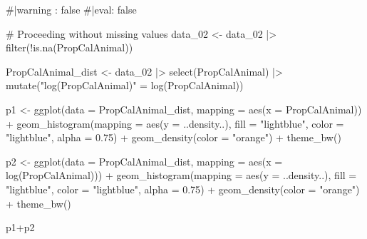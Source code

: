 \documentclass[
  letterpaper,
  DIV=11,
  numbers=noendperiod]{scrartcl}
\newenvironment{Shaded}{\begin{snugshade}}{\end{snugshade}}
\newcommand{\AttributeTok}[1]{\textcolor[rgb]{0.40,0.45,0.13}{#1}}
\newcommand{\CommentTok}[1]{\textcolor[rgb]{0.37,0.37,0.37}{#1}}
\newcommand{\FloatTok}[1]{\textcolor[rgb]{0.68,0.00,0.00}{#1}}
\newcommand{\FunctionTok}[1]{\textcolor[rgb]{0.28,0.35,0.67}{#1}}
\newcommand{\NormalTok}[1]{\textcolor[rgb]{0.00,0.23,0.31}{#1}}
\newcommand{\OtherTok}[1]{\textcolor[rgb]{0.00,0.23,0.31}{#1}}
\newcommand{\SpecialCharTok}[1]{\textcolor[rgb]{0.37,0.37,0.37}{#1}}
\newcommand{\StringTok}[1]{\textcolor[rgb]{0.13,0.47,0.30}{#1}}
\begin{document}
\begin{Shaded}
\begin{Highlighting}[]
\CommentTok{\#|warning : false}
\CommentTok{\#|eval: false}

\CommentTok{\# Proceeding without missing values}
\NormalTok{data\_02 }\OtherTok{\textless{}{-}}\NormalTok{ data\_02 }\SpecialCharTok{|\textgreater{}} 
  \FunctionTok{filter}\NormalTok{(}\SpecialCharTok{!}\FunctionTok{is.na}\NormalTok{(PropCalAnimal))}

\NormalTok{PropCalAnimal\_dist }\OtherTok{\textless{}{-}}\NormalTok{ data\_02 }\SpecialCharTok{|\textgreater{}} 
  \FunctionTok{select}\NormalTok{(PropCalAnimal) }\SpecialCharTok{|\textgreater{}} 
  \FunctionTok{mutate}\NormalTok{(}\StringTok{"log(PropCalAnimal)"} \OtherTok{=} \FunctionTok{log}\NormalTok{(PropCalAnimal))}

\NormalTok{p1 }\OtherTok{\textless{}{-}} \FunctionTok{ggplot}\NormalTok{(}\AttributeTok{data =}\NormalTok{ PropCalAnimal\_dist, }
             \AttributeTok{mapping =} \FunctionTok{aes}\NormalTok{(}\AttributeTok{x =}\NormalTok{ PropCalAnimal)) }\SpecialCharTok{+}
  \FunctionTok{geom\_histogram}\NormalTok{(}\AttributeTok{mapping =} \FunctionTok{aes}\NormalTok{(}\AttributeTok{y =}\NormalTok{ ..density..), }
                 \AttributeTok{fill =} \StringTok{"lightblue"}\NormalTok{, }\AttributeTok{color =} \StringTok{"lightblue"}\NormalTok{,}
                 \AttributeTok{alpha =} \FloatTok{0.75}\NormalTok{) }\SpecialCharTok{+}
  \FunctionTok{geom\_density}\NormalTok{(}\AttributeTok{color =} \StringTok{"orange"}\NormalTok{) }\SpecialCharTok{+} 
  \FunctionTok{theme\_bw}\NormalTok{()}

\NormalTok{p2 }\OtherTok{\textless{}{-}} \FunctionTok{ggplot}\NormalTok{(}\AttributeTok{data =}\NormalTok{ PropCalAnimal\_dist, }
             \AttributeTok{mapping =} \FunctionTok{aes}\NormalTok{(}\AttributeTok{x =} \StringTok{\textasciigrave{}}\AttributeTok{log(PropCalAnimal)}\StringTok{\textasciigrave{}}\NormalTok{)) }\SpecialCharTok{+}
  \FunctionTok{geom\_histogram}\NormalTok{(}\AttributeTok{mapping =} \FunctionTok{aes}\NormalTok{(}\AttributeTok{y =}\NormalTok{ ..density..), }
                 \AttributeTok{fill =} \StringTok{"lightblue"}\NormalTok{, }\AttributeTok{color =} \StringTok{"lightblue"}\NormalTok{,}
                 \AttributeTok{alpha =} \FloatTok{0.75}\NormalTok{) }\SpecialCharTok{+}
  \FunctionTok{geom\_density}\NormalTok{(}\AttributeTok{color =} \StringTok{"orange"}\NormalTok{) }\SpecialCharTok{+} 
  \FunctionTok{theme\_bw}\NormalTok{()}

\NormalTok{p1}\SpecialCharTok{+}\NormalTok{p2}
\end{Highlighting}
\end{Shaded}
\end{document}
